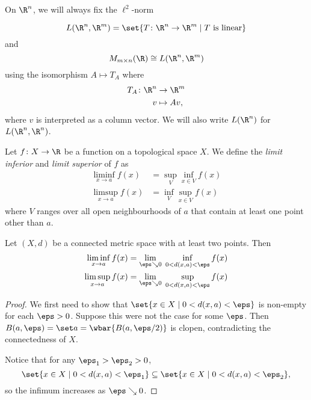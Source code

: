 On $\R^n$, we will always fix the $\ell^2$-norm

\begin{notation}
    \[
        L(\R^n, \R^m) = \set{T\colon \R^n \to \R^m \mid T \text{ is linear}}
    \] and \[
        M_{m \times n}(\R) \cong L(\R^n, \R^m)
    \] using the isomorphism $A \mapsto T_A$ where \begin{align*}
    T_A\colon \R^n &\to \R^m \\
          v &\mapsto Av,
    \end{align*} where $v$ is interpreted as a column vector.
    We will also write $L(\R^n)$ for $L(\R^n, \R^n)$.
\end{notation}

\begin{definition} \label{def:liminf-limsup}
    Let $f\colon X \to \R$ be a function on a topological space $X$.
    We define the \emph{limit inferior} and \emph{limit superior} of $f$ as
    \begin{align*}
        \liminf_{x \to a} f(x) &= \sup_V \inf_{x \in V} f(x) \\
        \limsup_{x \to a} f(x) &= \inf_V \sup_{x \in V} f(x)
    \end{align*} where $V$ ranges over all open neighbourhoods of $a$
    that contain at least one point other than $a$.
\end{definition}
\begin{exercise}[self]
    Let $(X, d)$ be a connected metric space with at least two points.
    Then \begin{align*}
        \liminf_{x \to a} f(x)
            &= \lim_{\eps \searrow 0}\; \inf_{0 < d(x, a) < \eps} f(x) \\
        \limsup_{x \to a} f(x)
            &= \lim_{\eps \searrow 0}\; \sup_{0 < d(x, a) < \eps} f(x)
    \end{align*}
\end{exercise}
\begin{proof}
    We first need to show that
    $\set{x \in X \mid 0 < d(x, a) < \eps}$ is non-empty
    for each $\eps > 0$.
    Suppose this were not the case for some $\eps$.
    Then $B(a, \eps) = \set a = \wbar{B(a, \eps/2)}$ is clopen,
    contradicting the connectedness of $X$.

    Notice that for any $\eps_1 > \eps_2 > 0$,
    \[
        \set{x \in X \mid 0 < d(x, a) < \eps_1}
        \subseteq \set{x \in X \mid 0 < d(x, a) < \eps_2},
    \] so the infimum increases as $\eps \searrow 0$.
\end{proof}

